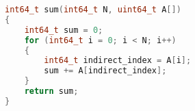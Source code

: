 \begin{lstlisting}[caption={Indirect Sum: Computes the sum by following a random walk through the array indices, accessing elements indirectly.},label={listing:indirect-sum}, name=indirect-sum, float=htbp, style=mystyle,language=C++]
int64_t sum(int64_t N, uint64_t A[])
{
    int64_t sum = 0;
    for (int64_t i = 0; i < N; i++)
    {
        int64_t indirect_index = A[i];
        sum += A[indirect_index];
    }
    return sum;
}
\end{lstlisting}